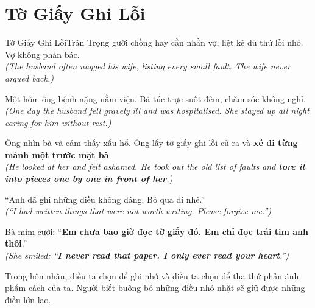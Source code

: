 \section{Tờ Giấy Ghi Lỗi}
\begin{truyen}{Tờ Giấy Ghi Lỗi}{Trân Trọng}
gười chồng hay cằn nhằn vợ, liệt kê đủ thứ lỗi nhỏ. Vợ không phản bác.\\
\textit{(The husband often nagged his wife, listing every small fault. The wife never argued back.)}

Một hôm ông bệnh nặng nằm viện. Bà túc trực suốt đêm, chăm sóc không nghỉ.\\
\textit{(One day the husband fell gravely ill and was hospitalised. She stayed up all night caring for him without rest.)}

Ông nhìn bà và cảm thấy xấu hổ. Ông lấy tờ giấy ghi lỗi cũ ra và \textbf{xé đi từng mảnh một trước mặt bà}.\\
\textit{(He looked at her and felt ashamed. He took out the old list of faults and \textbf{tore it into pieces one by one in front of her}.)}

``Anh đã ghi những điều không đáng. Bỏ qua đi nhé.''\\
\textit{(``I had written things that were not worth writing. Please forgive me.'')}

Bà mỉm cười: ``\textbf{Em chưa bao giờ đọc tờ giấy đó. Em chỉ đọc trái tim anh thôi}.''\\
\textit{(She smiled: ``\textbf{I never read that paper. I only ever read your heart}.'')}
\end{truyen}
\begin{baihoc}
  Trong hôn nhân, điều ta chọn để ghi nhớ và điều ta chọn để tha thứ phản ánh phẩm cách của ta. Người biết buông bỏ những điều nhỏ nhặt sẽ giữ được những điều lớn lao.
\end{baihoc}

